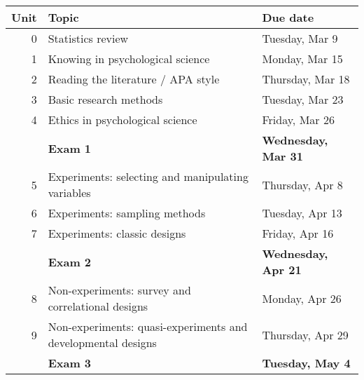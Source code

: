\documentclass[10pt]{article}
\begin{document}
\begin{center}
\begin{tabular}{rll}
Unit & Topic & Due date\\
\hline
0 & Statistics review & Tuesday, Mar 9\\
1 & Knowing in psychological science & Monday, Mar 15\\
2 & Reading the literature / APA style & Thursday, Mar 18\\
3 & Basic research methods & Tuesday, Mar 23\\
4 & Ethics in psychological science & Friday, Mar 26\\
 & \textbf{Exam 1} & \textbf{Wednesday, Mar 31}\\
5 & Experiments: selecting and manipulating variables & Thursday, Apr 8\\
6 & Experiments: sampling methods & Tuesday, Apr 13\\
7 & Experiments: classic designs & Friday, Apr 16\\
 & \textbf{Exam 2} & \textbf{Wednesday, Apr 21}\\
8 & Non-experiments: survey and correlational designs & Monday, Apr 26\\
9 & Non-experiments: quasi-experiments and developmental designs & Thursday, Apr 29\\
 & \textbf{Exam 3} & \textbf{Tuesday, May 4}\\
\end{tabular}
\end{center}
\end{document}
